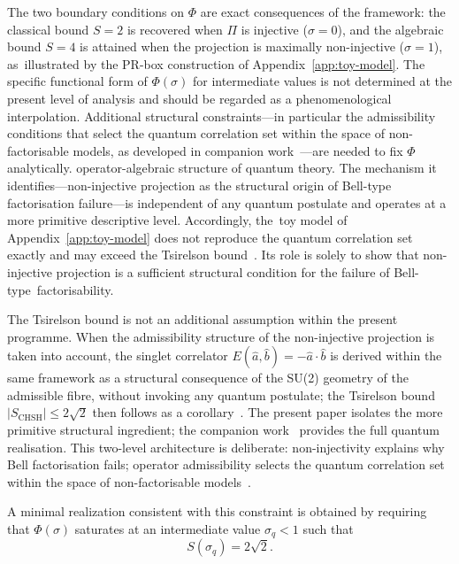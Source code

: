 \documentclass[quantumrep,article,accept,pdftex,oneauthor]{Definitions/mdpi}
\theoremstyle{remark}
\begin{document}
  The two boundary conditions on $\Phi$ are exact consequences of the framework:
  the classical bound $S = 2$ is recovered when $\Pi$ is injective ($\sigma = 0$),
  and the algebraic bound $S = 4$ is attained when the projection is maximally
  non-injective ($\sigma = 1$), as~illustrated by the PR-box construction of
  Appendix~\ref{app:toy-model}.
  The specific functional form of $\Phi(\sigma)$ for intermediate values is not
  determined at the present level of analysis and should be regarded as a
  phenomenological interpolation.
  Additional structural constraints---in particular the admissibility conditions
  that select the quantum correlation set within the space of non-factorisable models,
  as developed in companion work~\cite{Q1}---are needed to fix $\Phi$ analytically.
  operator-algebraic structure of quantum theory.
  The mechanism it identifies---non-injective projection as the structural origin of
  Bell-type factorisation failure---is independent of any quantum postulate and operates
  at a more primitive descriptive level.
  Accordingly, the~toy model of Appendix~\ref{app:toy-model} does not reproduce the quantum correlation
  set exactly and may exceed the Tsirelson bound~\cite{Tsirelson1980}.
  Its role is solely to show that non-injective projection is a sufficient structural
  condition for the failure of Bell-type~factorisability.

  The Tsirelson bound is not an additional assumption within the present programme.
  When the admissibility structure of the non-injective projection is taken into account,
  the singlet correlator $E(\hat{a}, \hat{b}) = -\hat{a} \cdot \hat{b}$ is derived within
  the same framework as a structural consequence of the SU(2) geometry of the admissible fibre,
  without invoking any quantum postulate; the Tsirelson bound
  $|S_\mathrm{CHSH}| \le 2\sqrt{2}$ then follows as a corollary~\cite{Q1}.
  The present paper isolates the more primitive structural ingredient; the companion
  work~\cite{Q1} provides the full quantum realisation.
  This two-level architecture is deliberate: non-injectivity explains why Bell
  factorisation fails; operator admissibility selects the quantum correlation set
  within the space of non-factorisable models~\cite{Brunner2014}.

  A minimal realization consistent with this constraint is obtained by requiring that
  $\Phi(\sigma)$ saturates at an intermediate value $\sigma_q < 1$ such that
\begin{equation}
    S(\sigma_q) = 2\sqrt{2}.
  \end{equation}
\end{document}
